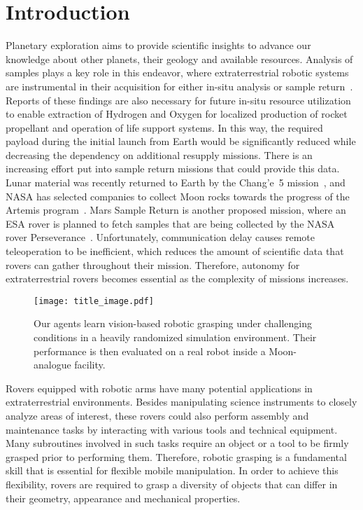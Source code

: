 \section{Introduction}\label{sec:introduction}

Planetary exploration aims to provide scientific insights to advance our knowledge about other planets, their geology and available resources. Analysis of samples plays a key role in this endeavor, where extraterrestrial robotic systems are instrumental in their acquisition for either in-situ analysis or sample return~\cite{zhang_progress_2019}. Reports of these findings are also necessary for future in-situ resource utilization~\cite{moses_frontier_2016} to enable extraction of Hydrogen and Oxygen for localized production of rocket propellant and operation of life support systems. In this way, the required payload during the initial launch from Earth would be significantly reduced while decreasing the dependency on additional resupply missions. There is an increasing effort put into sample return missions that could provide this data. Lunar material was recently returned to Earth by the Chang'e~5 mission~\cite{liu_landing_2021}, and NASA has selected companies to collect Moon rocks towards the progress of the Artemis program~\cite{schierholz_nasa_2020}. Mars Sample Return is another proposed mission, where an ESA rover is planned to fetch samples that are being collected by the NASA rover Perseverance~\cite{muirhead_mars_2019}. Unfortunately, communication delay causes remote teleoperation to be inefficient, which reduces the amount of scientific data that rovers can gather throughout their mission. Therefore, autonomy for extraterrestrial rovers becomes essential as the complexity of missions increases.

\begin{figure}[t]
	\vspace{2.057mm}
	\centering
	\texttt{[image: title\_image.pdf]}
	\caption{Our agents learn vision-based robotic grasping under challenging conditions in a heavily randomized simulation environment. Their performance is then evaluated on a real robot inside a Moon-analogue facility.}
	\label{fig:front_page_figure}
	\vspace{-1.0\baselineskip}
\end{figure}

Rovers equipped with robotic arms have many potential applications in extraterrestrial environments. Besides manipulating science instruments to closely analyze areas of interest, these rovers could also perform assembly and maintenance tasks by interacting with various tools and technical equipment. Many subroutines involved in such tasks require an object or a tool to be firmly grasped prior to performing them. Therefore, robotic grasping is a fundamental skill that is essential for flexible mobile manipulation. In order to achieve this flexibility, rovers are required to grasp a diversity of objects that can differ in their geometry, appearance and mechanical properties.

